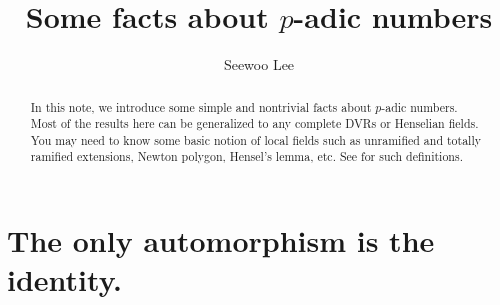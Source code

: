 \documentclass{article}
\title{Some facts about $p$-adic numbers}
\author{Seewoo Lee}
\begin{document}
\maketitle
\begin{abstract}
In this note, we introduce some simple and nontrivial facts about $p$-adic numbers. Most of the results here can be generalized to any complete DVRs or Henselian fields. 
You may need to know some basic notion of local fields such as unramified and totally ramified extensions, Newton polygon, Hensel's lemma, etc. See \cite{neu} for such definitions. 
\end{abstract}

\section{The only automorphism is the identity.}
\end{document}
